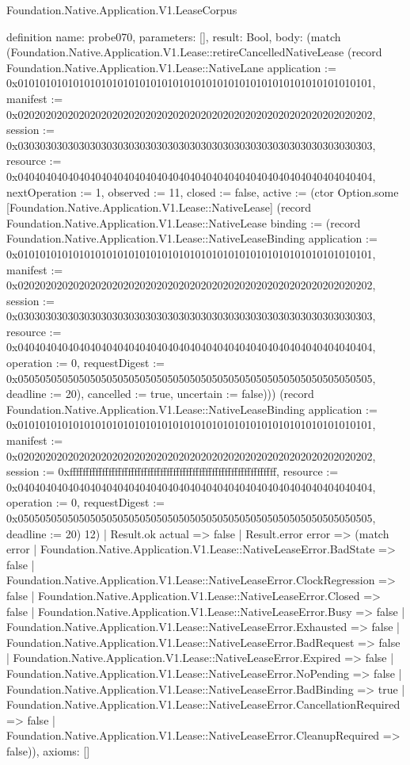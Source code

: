 \begin{lexlean}{Foundation.Native.Application.V1.LeaseCorpus}
\begin{semanticmodule}
definition{
  name: probe070,
  parameters: [],
  result: Bool,
  body: (match (Foundation.Native.Application.V1.Lease::retireCancelledNativeLease (record Foundation.Native.Application.V1.Lease::NativeLane {application := 0x0101010101010101010101010101010101010101010101010101010101010101, manifest := 0x0202020202020202020202020202020202020202020202020202020202020202, session := 0x0303030303030303030303030303030303030303030303030303030303030303, resource := 0x0404040404040404040404040404040404040404040404040404040404040404, nextOperation := 1, observed := 11, closed := false, active := (ctor Option.some [Foundation.Native.Application.V1.Lease::NativeLease] (record Foundation.Native.Application.V1.Lease::NativeLease {binding := (record Foundation.Native.Application.V1.Lease::NativeLeaseBinding {application := 0x0101010101010101010101010101010101010101010101010101010101010101, manifest := 0x0202020202020202020202020202020202020202020202020202020202020202, session := 0x0303030303030303030303030303030303030303030303030303030303030303, resource := 0x0404040404040404040404040404040404040404040404040404040404040404, operation := 0, requestDigest := 0x0505050505050505050505050505050505050505050505050505050505050505, deadline := 20}), cancelled := true, uncertain := false}))}) (record Foundation.Native.Application.V1.Lease::NativeLeaseBinding {application := 0x0101010101010101010101010101010101010101010101010101010101010101, manifest := 0x0202020202020202020202020202020202020202020202020202020202020202, session := 0xffffffffffffffffffffffffffffffffffffffffffffffffffffffffffffffff, resource := 0x0404040404040404040404040404040404040404040404040404040404040404, operation := 0, requestDigest := 0x0505050505050505050505050505050505050505050505050505050505050505, deadline := 20}) 12)
    | Result.ok actual => false
    | Result.error error => (match error
      | Foundation.Native.Application.V1.Lease::NativeLeaseError.BadState => false
      | Foundation.Native.Application.V1.Lease::NativeLeaseError.ClockRegression => false
      | Foundation.Native.Application.V1.Lease::NativeLeaseError.Closed => false
      | Foundation.Native.Application.V1.Lease::NativeLeaseError.Busy => false
      | Foundation.Native.Application.V1.Lease::NativeLeaseError.Exhausted => false
      | Foundation.Native.Application.V1.Lease::NativeLeaseError.BadRequest => false
      | Foundation.Native.Application.V1.Lease::NativeLeaseError.Expired => false
      | Foundation.Native.Application.V1.Lease::NativeLeaseError.NoPending => false
      | Foundation.Native.Application.V1.Lease::NativeLeaseError.BadBinding => true
      | Foundation.Native.Application.V1.Lease::NativeLeaseError.CancellationRequired => false
      | Foundation.Native.Application.V1.Lease::NativeLeaseError.CleanupRequired => false)),
  axioms: []
}


\end{semanticmodule}
\end{lexlean}
